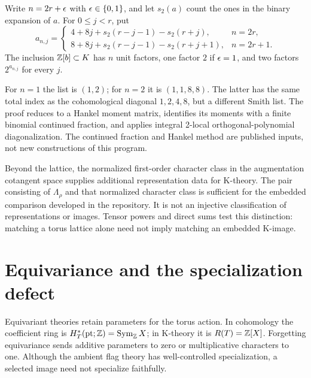 \begin{theorem}
Write $n=2r+\epsilon$ with $\epsilon\in\{0,1\}$, and let $s_2(a)$ count the ones in the binary expansion of $a$. For $0\le j<r$, put
\[
 a_{n,j}=\begin{cases}
 4+8j+s_2(r-j-1)-s_2(r+j),&n=2r,\\
 8+8j+s_2(r-j-1)-s_2(r+j+1),&n=2r+1.
 \end{cases}
\]
The inclusion $\mathbb Z[b]\subset K$ has $n$ unit factors, one factor $2$ if $\epsilon=1$, and two factors $2^{a_{n,j}}$ for every $j$.
\end{theorem}
For $n=1$ the list is $(1,2)$; for $n=2$ it is $(1,1,8,8)$. The latter has the same total index as the cohomological diagonal $1,2,4,8$, but a different Smith list. The proof reduces to a Hankel moment matrix, identifies its moments with a finite binomial continued fraction, and applies integral 2-local orthogonal-polynomial diagonalization. The continued fraction and Hankel method are published inputs, not new constructions of this program.

Beyond the lattice, the normalized first-order character class in the augmentation cotangent space supplies additional representation data for K-theory. The pair consisting of $\Lambda_\rho$ and that normalized character class is sufficient for the embedded comparison developed in the repository. It is not an injective classification of representations or images. Tensor powers and direct sums test this distinction: matching a torus lattice alone need not imply matching an embedded K-image.


\section{Equivariance and the specialization defect}
Equivariant theories retain parameters for the torus action. In cohomology the coefficient ring is $H_T^*(\mathrm{pt};\mathbb Z)=\operatorname{Sym}_\mathbb Z X$; in K-theory it is $R(T)=\mathbb Z[X]$. Forgetting equivariance sends additive parameters to zero or multiplicative characters to one. Although the ambient flag theory has well-controlled specialization, a selected image need not specialize faithfully.

